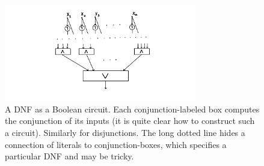 \documentclass[12pt,notitlepage]{article}
\theoremstyle{plain}
\theoremstyle{definition}
\theoremstyle{plain}
\newcommand{\1}{\mathbf{1}}
\newcommand{\0}{\mathbf{0}}
\begin{document}
\begin{figure}[h]
	\centering
	\includegraphics*[width=0.75\textwidth]{circuits_dnf.pdf}
	\caption{A DNF as a Boolean circuit. Each conjunction-labeled box computes the conjunction of its inputs (it is quite clear how to construct such a circuit). Similarly for disjunctions. The long dotted line hides a connection of literals to conjunction-boxes, which specifies a particular DNF and may be tricky.}
\end{figure}
\end{document}
